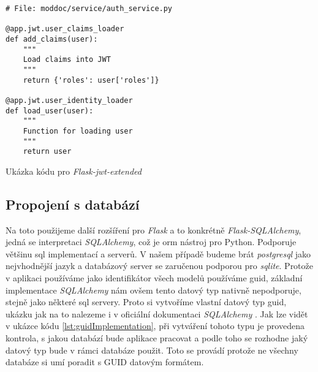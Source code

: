 \begin{listing}
    \begin{verbatim}
# File: moddoc/service/auth_service.py

@app.jwt.user_claims_loader
def add_claims(user):
    """
    Load claims into JWT
    """
    return {'roles': user['roles']}

@app.jwt.user_identity_loader
def load_user(user):
    """
    Function for loading user
    """
    return user
    \end{verbatim}
    \caption{Ukázka kódu pro \textit{Flask-jwt-extended}}
    \label{lst:flaskJWTCode}
\end{listing}

\subsection{Propojení s databází}

Na toto použijeme další rozšíření pro \textit{Flask} a to konkrétně \textit{Flask-SQLAlchemy}, jedná se interpretaci \textit{SQLAlchemy}, což je \gls{orm} nástroj pro Python.
Podporuje většinu \gls{sql} implementací a serverů. V našem případě budeme brát \textit{postgresql} jako nejvhodnější jazyk a databázový server se zaručenou podporou pro \textit{sqlite}. Protože
v aplikaci používáme jako identifikátor všech modelů používáme \gls{guid}, základní implementace \textit{SQLAlchemy} nám ovšem tento datový typ nativně nepodporuje, stejně jako
některé \gls{sql} servery. Proto si vytvoříme vlastní datový typ \gls{guid}, ukázku jak na to nalezeme i v oficiální dokumentaci \textit{SQLAlchemy} \cite{sqlalchemyGuid}. Jak lze
vidět v ukázce kódu \ref{lst:guidImplementation}, při vytváření tohoto typu je provedena kontrola, s jakou databází bude aplikace pracovat a podle toho se rozhodne jaký datový typ
bude v rámci databáze použit. Toto se provádí protože ne všechny databáze si umí poradit s GUID datovým formátem.

